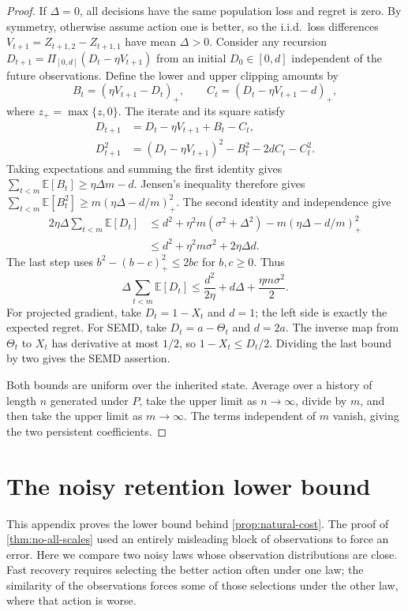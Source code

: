 \documentclass[11pt,twoside]{article}
\newcommand{\E}{\mathbb E}
\theoremstyle{definition}
\theoremstyle{remark}
\begin{document}
\begin{proof}
If $\Delta=0$, all decisions have the same population loss and regret is
zero. By symmetry, otherwise assume action one is better, so the i.i.d.\
loss differences $V_{t+1}=Z_{t+1,2}-Z_{t+1,1}$ have mean $\Delta>0$.
Consider any recursion
$D_{t+1}=\Pi_{[0,d]}(D_t-\eta V_{t+1})$ from an initial $D_0\in[0,d]$
independent of the future observations. Define the lower and upper clipping
amounts by
\[
 B_t=(\eta V_{t+1}-D_t)_+,\qquad
 C_t=(D_t-\eta V_{t+1}-d)_+,
\]
where $z_+=\max\{z,0\}$. The iterate and its square satisfy
\begin{align*}
 D_{t+1}&=D_t-\eta V_{t+1}+B_t-C_t,\\
 D_{t+1}^2&=(D_t-\eta V_{t+1})^2-B_t^2-2dC_t-C_t^2.
\end{align*}
Taking expectations and summing the first identity gives
$\sum_{t<m}\E[B_t]\ge\eta\Delta m-d$.
Jensen's inequality therefore gives
$\sum_{t<m}\E[B_t^2]\ge m(\eta\Delta-d/m)_+^2$.
The second identity and independence give
\begin{align*}
 2\eta\Delta\sum_{t<m}\E[D_t]
 &\le d^2+\eta^2m(\sigma^2+\Delta^2)
                   -m(\eta\Delta-d/m)_+^2\\
 &\le d^2+\eta^2m\sigma^2+2\eta\Delta d.
\end{align*}
The last step uses $b^2-(b-c)_+^2\le2bc$ for $b,c\ge0$.
Thus
\[
 \Delta\sum_{t<m}\E[D_t]
 \le\frac{d^2}{2\eta}+d\Delta+\frac{\eta m\sigma^2}{2}.
\]
For projected gradient, take $D_t=1-X_t$ and $d=1$; the left side is
exactly the expected regret. For SEMD, take $D_t=a-\Theta_t$ and
$d=2a$. The inverse map from $\Theta_t$ to $X_t$ has derivative at most
$1/2$, so $1-X_t\le D_t/2$. Dividing the last bound by two gives the
SEMD assertion.

Both bounds are uniform over the inherited state. Average over a history
of length $n$ generated under $P$, take the upper limit as $n\to\infty$,
divide by $m$, and then take the upper limit as $m\to\infty$.
The terms independent of $m$ vanish, giving the two persistent coefficients.
\end{proof}

\section{The noisy retention lower bound}
\label{app:retention-cost}

This appendix proves the lower bound behind \cref{prop:natural-cost}.
The proof of \cref{thm:no-all-scales} used an entirely misleading block of
observations to force an error. Here we compare two noisy laws whose
observation distributions are close. Fast recovery requires selecting the
better action often under one law; the similarity of the observations
forces some of those selections under the other law, where that action
is worse.
\end{document}
